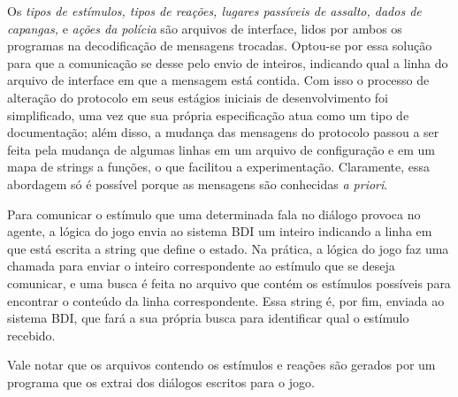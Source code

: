 Os \emph{tipos de estímulos, tipos de reações, lugares passíveis de assalto, dados de capangas,} e \emph{ações da polícia} são arquivos de interface, lidos por ambos os programas na decodificação de mensagens trocadas. Optou-se por essa solução para que a comunicação se desse pelo envio de inteiros, indicando qual a linha do arquivo de interface
em que a mensagem está contida. Com isso o processo de alteração do protocolo em seus estágios iniciais de desenvolvimento foi simplificado, uma vez que sua própria especificação atua como um tipo de documentação; além disso, a mudança das mensagens do protocolo passou a ser feita pela mudança de algumas linhas em um arquivo de configuração e em um mapa de strings a funções, o que facilitou a experimentação. Claramente, essa abordagem só é
possível porque as mensagens são conhecidas \emph{a priori}.

Para comunicar o estímulo que uma determinada fala no diálogo provoca
no agente, a lógica do jogo envia ao sistema BDI um inteiro indicando
a linha em que está escrita a string que define o estado. Na prática,
a lógica do jogo faz uma chamada para enviar o inteiro correspondente
ao estímulo que se deseja comunicar, e uma busca é feita no arquivo
que contém os estímulos possíveis para encontrar o conteúdo da linha
correspondente. Essa string é, por fim, enviada ao sistema BDI, que
fará a sua própria busca para identificar qual o estímulo recebido.

Vale notar que os arquivos contendo os estímulos e reações são gerados por um programa que os extrai dos diálogos escritos para o jogo.


